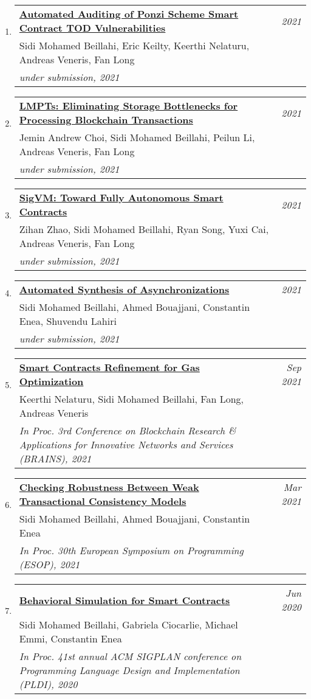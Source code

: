 \documentclass[10pt]{article}
\makeatletter
\newcommand{\lbar}[1]{{\color{#1}\ding{118}}\hspace*{2pt}}
\newenvironment{benumerate}[2]{
    \let\oldItem\item
    \def\item{\addtocounter{enumi}{-2}\oldItem}
    \begin{enumerate}[#2] \itemsep3pt
    \setcounter{enumi}{#1}
    \addtocounter{enumi}{1}}
  {\end{enumerate}}
\newenvironment{publication}[5]
{ \item
  \begin{tabular*}{7.5in}{p{6.3in}@{\extracolsep{\fill}}r}
    \href{#1}{\textbf{#2}} & \textit{#3}\\ #4 &\\ \textit{#5}&\\
  \end{tabular*}
} {}
\newenvironment{region}[3]{%
  \vspace*{0.5ex}
  {\scalebox{1.4}{\textbf{#1}}}
  \begin{benumerate}{#3}{\color{RoyalBlue}#2}}
  {\end{benumerate}\vspace{0.8ex}}
\makeatother
\begin{document}
\begin{region} {\lbar{purple}Conference Publications}{{C}1}{11}

  \begin{publication} {https://beillahi.github.io/papers/TOD.pdf}
		{Automated Auditing of Ponzi Scheme Smart Contract TOD Vulnerabilities}
		{2021} {Sidi Mohamed Beillahi, Eric Keilty, Keerthi Nelaturu, Andreas Veneris, Fan Long}
		{under submission, 2021}
  \end{publication}

  \begin{publication} {https://beillahi.github.io/papers/LMPT.pdf}
		{LMPTs: Eliminating Storage Bottlenecks for Processing Blockchain Transactions}
		{2021} {Jemin Andrew Choi, Sidi Mohamed Beillahi, Peilun Li, Andreas Veneris, Fan Long}
		{under submission, 2021}
  \end{publication}
  
  \begin{publication} {https://arxiv.org/pdf/2102.10784.pdf}
		{SigVM: Toward Fully Autonomous Smart Contracts}
		{2021} {Zihan Zhao, Sidi Mohamed Beillahi, Ryan Song, Yuxi Cai, Andreas Veneris, Fan Long}
		{under submission, 2021}
  \end{publication}

  \begin{publication} {https://beillahi.github.io/papers/asynchrony.pdf}
		{Automated Synthesis of Asynchronizations}
		{2021} {Sidi Mohamed Beillahi, Ahmed Bouajjani, Constantin Enea, Shuvendu Lahiri}
		{under submission, 2021}
  \end{publication}

  \begin{publication} {https://beillahi.github.io/papers/BRAINS21.pdf}
		{Smart Contracts Refinement for Gas Optimization}
		{Sep 2021} {Keerthi Nelaturu, Sidi Mohamed Beillahi, Fan Long, Andreas Veneris}
		{In Proc. 3rd Conference on Blockchain Research \& Applications for Innovative Networks and Services (BRAINS), 2021}
  \end{publication}

  \begin{publication} {https://beillahi.github.io/papers/ESOP21.pdf}
		{Checking Robustness Between Weak Transactional Consistency Models}
		{Mar 2021} {Sidi Mohamed Beillahi, Ahmed Bouajjani, Constantin Enea} 
		{In Proc. 30th European Symposium on Programming (ESOP), 2021} 
  \end{publication}

	\begin{publication} {https://beillahi.github.io/papers/PLDI20.pdf}
		{Behavioral Simulation for Smart Contracts}
		{Jun 2020} {Sidi Mohamed Beillahi, Gabriela Ciocarlie, Michael Emmi, Constantin Enea}
		{In Proc. 41st annual ACM SIGPLAN conference on Programming Language Design and Implementation (PLDI), 2020}
  \end{publication}


\end{region}
\end{document}
